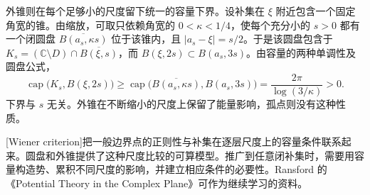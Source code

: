 \ProseParagraphBreak

外锥则在每个足够小的尺度留下统一的容量下界。设补集在 \(\xi\) 附近包含一个固定角宽的锥。由缩放，可取只依赖角宽的 \(0<\kappa<1/4\)，使每个充分小的 \(s>0\) 都有一个闭圆盘 \(\overline{B(a_s,\kappa s)}\) 位于该锥内，且 \(|a_s-\xi|=s/2\)。于是该圆盘包含于
\(K_s=(\mathbb C\setminus D)\cap\overline{B(\xi,s)}\)，而 \(B(\xi,2s)\subset B(a_s,3s)\)。由容量的两种单调性及圆盘公式，
\[
 \operatorname{cap}\bigl(K_s,B(\xi,2s)\bigr)
 \ge\operatorname{cap}\bigl(\overline{B(a_s,\kappa s)},B(a_s,3s)\bigr)
 =\frac{2\pi}{\log(3/\kappa)}>0.
\]
下界与 \(s\) 无关。外锥在不断缩小的尺度上保留了能量影响，孤点则没有这种性质。

\ProseParagraphBreak

[Wiener criterion]把一般边界点的正则性与补集在逐层尺度上的容量条件联系起来。圆盘和外锥提供了这种尺度比较的可算模型。推广到任意闭补集时，需要用容量构造势、累积不同尺度的影响，并建立相应条件的必要性。Ransford 的《Potential Theory in the Complex Plane》\cite{Ransford1995Potential}可作为继续学习的资料。

